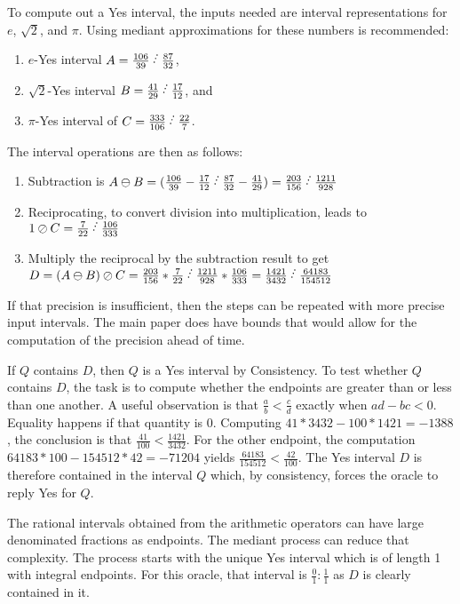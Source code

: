 \documentclass[12pt]{article}
\begin{document}
To compute out a Yes interval, the inputs needed are interval representations for $e$, $\sqrt{2}$, and $\pi$. Using mediant approximations for these numbers is recommended: 
\begin{enumerate}
\item $e$-Yes interval $A  = \frac{106}{39} \lte \frac{87}{32}$,
\item $\sqrt{2}$-Yes interval $B = \frac{41}{29} \lte \frac{17}{12}$, and
\item $\pi$-Yes interval of $C= \frac{333}{106} \lte \frac{22}{7}$.
\end{enumerate}
The interval operations are then as follows:
\begin{enumerate}
\item Subtraction is $A\ominus B = (\frac{106}{39} - \frac{17}{12} \lte \frac{87}{32} - \frac{41}{29}) = \frac{203}{156} \lte \frac{1211}{928}$ 
\item Reciprocating, to convert division into multiplication, leads to  $1\oslash C = \frac{7}{22} \lte \frac{106}{333}$
\item Multiply the reciprocal by the subtraction result to get $D = (A\ominus B)\oslash C = \frac{203}{156} *\frac{7}{22} \lte \frac{1211}{928} * \frac{106}{333} = \frac{1421}{3432} \lte \frac{64183}{154512}$
\end{enumerate}
If that precision is insufficient, then the steps can be repeated with more precise input intervals. The main paper does have bounds that would allow for the computation of the precision ahead of time. 

If $Q$ contains $D$, then $Q$ is a Yes interval by Consistency. To test whether $Q$ contains $D$, the task is to compute whether the endpoints are greater than or less than one another. A useful observation is that $\frac{a}{b} < \frac{c}{d}$ exactly when $ad - bc < 0$. Equality happens if that quantity is 0. Computing $41*3432 - 100*1421 = -1388$, the conclusion is that $\frac{41}{100} < \frac{1421}{3432}$. For the other endpoint, the computation $64183*100 - 154512*42 = -71204$ yields $ \frac{64183}{154512} < \frac{42}{100}$. The Yes interval $D$ is therefore contained in the interval $Q$ which, by consistency, forces the oracle to reply Yes for $Q$. 

The rational intervals obtained from the arithmetic operators can have large denominated fractions as endpoints. The mediant process can reduce that complexity. The process starts with the unique Yes interval which is of length 1 with integral endpoints. For this oracle, that interval is $\frac{0}{1}:\frac{1}{1}$ as $D$ is clearly contained in it. 
\end{document}
